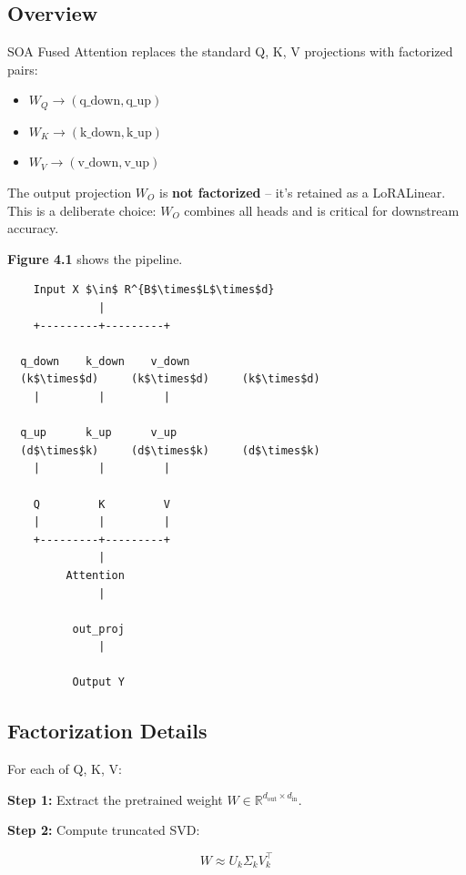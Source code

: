 \subsection{Overview}

SOA Fused Attention replaces the standard Q, K, V projections with 
factorized pairs:

\begin{itemize}
\item $W_Q \to (\text{q\_down}, \text{q\_up})$
\item $W_K \to (\text{k\_down}, \text{k\_up})$
\item $W_V \to (\text{v\_down}, \text{v\_up})$

\end{itemize}
The output projection $W_O$ is \textbf{not factorized} -- it's retained as a 
LoRALinear. This is a deliberate choice: $W_O$ combines all heads and is 
critical for downstream accuracy.

\textbf{Figure 4.1} shows the pipeline.

\begin{lstlisting}
    Input X $\in$ R^{B$\times$L$\times$d}
              |
    +---------+---------+
                         
  q_down    k_down    v_down
  (k$\times$d)     (k$\times$d)     (k$\times$d)
    |         |         |
                         
  q_up      k_up      v_up
  (d$\times$k)     (d$\times$k)     (d$\times$k)
    |         |         |
                         
    Q         K         V
    |         |         |
    +---------+---------+
              |
         Attention
              |
               
          out_proj
              |
               
          Output Y
\end{lstlisting}

\subsection{Factorization Details}

For each of Q, K, V:

\textbf{Step 1:} Extract the pretrained weight $W \in \mathbb{R}^{d_\text{out} \times d_\text{in}}$.

\textbf{Step 2:} Compute truncated SVD:

\[
W \approx U_k \Sigma_k V_k^\top
\]

